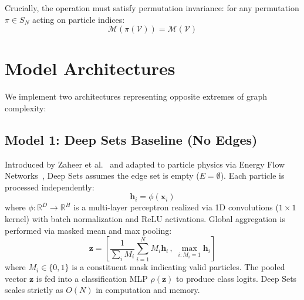 \documentclass[10pt,twocolumn,letterpaper]{article}
\begin{document}
Crucially, the operation must satisfy permutation invariance: for any permutation $\pi \in S_N$ acting on particle indices:
\begin{equation}
    \mathcal{M}(\pi(\mathcal{V})) = \mathcal{M}(\mathcal{V})
\end{equation}

\section{Model Architectures}

We implement two architectures representing opposite extremes of graph complexity:

\subsection{Model 1: Deep Sets Baseline (No Edges)}
Introduced by Zaheer et al.~\cite{zaheer2017deepsets} and adapted to particle physics via Energy Flow Networks~\cite{komiske2019efn}, Deep Sets assumes the edge set is empty ($E = \emptyset$). Each particle is processed independently:
\begin{equation}
    \mathbf{h}_i = \phi(\mathbf{x}_i)
\end{equation}
where $\phi: \mathbb{R}^D \to \mathbb{R}^H$ is a multi-layer perceptron realized via 1D convolutions ($1 \times 1$ kernel) with batch normalization and ReLU activations. Global aggregation is performed via masked mean and max pooling:
\begin{equation}
    \mathbf{z} = \left[ \frac{1}{\sum_i M_i} \sum_{i=1}^N M_i \mathbf{h}_i \, , \; \max_{i: M_i=1} \mathbf{h}_i \right]
\end{equation}
where $M_i \in \{0, 1\}$ is a constituent mask indicating valid particles. The pooled vector $\mathbf{z}$ is fed into a classification MLP $\rho(\mathbf{z})$ to produce class logits. Deep Sets scales strictly as $O(N)$ in computation and memory.
\end{document}
